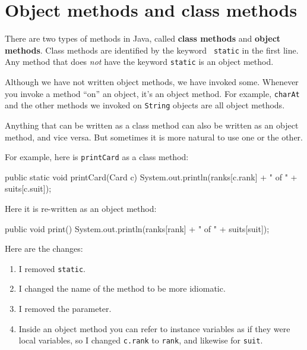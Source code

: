 \section{Object methods and class methods}

There are two types of methods in Java, called {\bf class methods} and
{\bf object methods}.  Class methods are identified by the keyword {\tt
  static} in the first line.  Any method that does {\em not} have the
keyword {\tt static} is an object method.

Although we have not written object methods, we have invoked some.
Whenever you invoke a method ``on'' an object, it's an object method.
For example, {\tt charAt} and the other methods we invoked on {\tt String}
objects are all object methods.

Anything that can be written as a class method can also be written as an
object method, and vice versa.  But sometimes it is more natural to
use one or the other.

For example, here is {\tt printCard} as a class method:

\begin{code}
    public static void printCard(Card c) {
        System.out.println(ranks[c.rank] + " of " + suits[c.suit]);
    }
\end{code}

Here it is re-written as an object method:

\begin{code}
    public void print() {
        System.out.println(ranks[rank] + " of " + suits[suit]);
    }
\end{code}

Here are the changes:

\begin{enumerate}

\item I removed {\tt static}.

\item I changed the name of the method to be more idiomatic.

\item I removed the parameter.

\item Inside an object method you can refer to instance variables
as if they were local variables, so I changed {\tt c.rank} to {\tt rank},
and likewise for {\tt suit}.

\end{enumerate}

